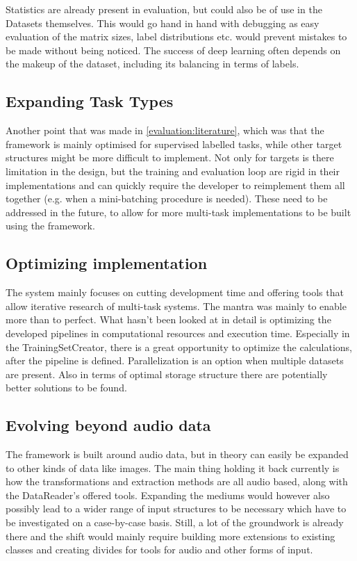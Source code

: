 Statistics are already present in evaluation, but could also be of use in the Datasets themselves. This would go hand in hand with debugging as easy evaluation of the matrix sizes, label distributions etc. would prevent mistakes to be made without being noticed. The success of deep learning often depends on the makeup of the dataset, including its balancing in terms of labels.

\subsection{Expanding Task Types}

Another point that was made in \ref{evaluation:literature}, which was that the framework is mainly optimised for supervised labelled tasks, while other target structures might be more difficult to implement. Not only for targets is there limitation in the design, but the training and evaluation loop are rigid in their implementations and can quickly require the developer to reimplement them all together (e.g. when a mini-batching procedure is needed). These need to be addressed in the future, to allow for more multi-task implementations to be built using the framework. 

\subsection{Optimizing implementation}

The system mainly focuses on cutting development time and offering tools that allow iterative research of multi-task systems. The mantra was mainly to enable more than to perfect. What hasn't been looked at in detail is optimizing the developed pipelines in computational resources and execution time. Especially in the TrainingSetCreator, there is a great opportunity to optimize the calculations, after the pipeline is defined. Parallelization is an option when multiple datasets are present. Also in terms of optimal storage structure there are potentially better solutions to be found.

\subsection{Evolving beyond audio data}

The framework is built around audio data, but in theory can easily be expanded to other kinds of data like images. The main thing holding it back currently is how the transformations and extraction methods are all audio based, along with the DataReader's offered tools. Expanding the mediums would however also possibly lead to a wider range of input structures to be necessary which have to be investigated on a case-by-case basis. Still, a lot of the groundwork is already there and the shift would mainly require building more extensions to existing classes and creating divides for tools for audio and other forms of input.

